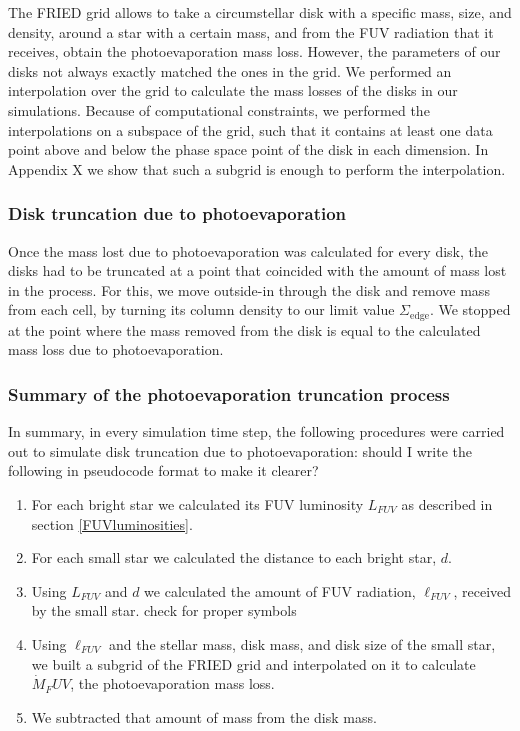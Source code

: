 \documentclass[fleqn,usenatbib]{mnras}
\newcommand\note[1]{{\colorbox{yellow!60}{\color{magenta}#1}}}
\begin{document}
The FRIED grid allows to take a circumstellar disk with a specific mass, size, and density, around a star with a certain mass, and from the FUV radiation that it receives, obtain the photoevaporation mass loss. However, the parameters of our disks not always exactly matched the ones in the grid. We performed an interpolation over the grid to calculate the mass losses of the disks in our simulations. Because of computational constraints, we performed the interpolations on a subspace of the grid, such that it contains at least one data point above and below the phase space point of the disk in each dimension. In \note{Appendix X} we show that such a subgrid is enough to perform the interpolation.

\subsubsection{Disk truncation due to photoevaporation}\label{omnomnom}
Once the mass lost due to photoevaporation was calculated for every disk, the disks had to be truncated at a point that coincided with the amount of mass lost in the process. For this, we move outside-in through the disk and remove mass from each cell, by turning its column density to our limit value $\Sigma_{\mathrm{edge}}$. We stopped at the point where the mass removed from the disk is equal to the calculated mass loss due to photoevaporation.

\subsubsection{Summary of the photoevaporation truncation process}
In summary, in every simulation time step, the following procedures were carried out to simulate disk truncation due to photoevaporation:
\note{should I write the following in pseudocode format to make it clearer?}
\begin{enumerate}
\item For each bright star we calculated its FUV luminosity $L_{FUV}$ as described in section \ref{FUVluminosities}.
\item For each small star we calculated the distance to each bright star, $d$.
\item Using $L_{FUV}$ and $d$ we calculated the amount of FUV radiation, $\ell_{FUV}$, received by the small star. \note{check for proper symbols}
\item Using $\ell_{FUV}$ and the stellar mass, disk mass, and disk size of the small star, we built a subgrid of the FRIED grid and interpolated on it to calculate $\dot{M}_FUV$, the photoevaporation mass loss.
\item We subtracted that amount of mass from the disk mass.
\end{enumerate}
\end{document}
